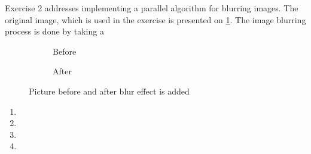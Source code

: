 Exercise 2 addresses implementing a parallel algorithm for blurring images.
The original image, which is used in the exercise is presented on \cref{fig:ex2-before}.
The image blurring process is done by taking a 



\begin{figure}[ht]
	\centering
	\begin{subfigure}{.5\textwidth}
		\centering
		\caption{Before}
		\label{fig:ex2-before}
	\end{subfigure}%
	\begin{subfigure}{.5\textwidth}
		\centering
		\caption{After}
		\label{fig:ex2-after}
	\end{subfigure}
	\caption{Picture before and after blur effect is added}
	\label{fig:ex4}
\end{figure}

\begin{enumerate}
	\item[\textbf{Step 0}]

	\item[\textbf{Step 1}]

	\item[\textbf{Step 2}]

	\item[\textbf{Step 3}]
\end{enumerate}

